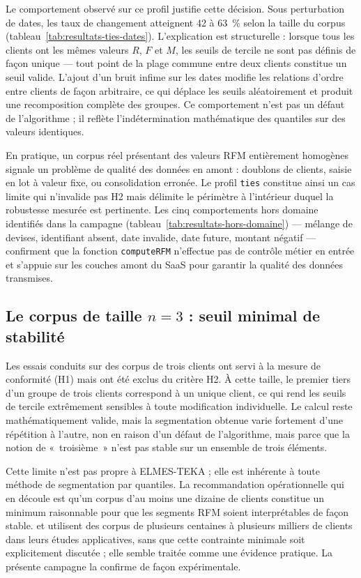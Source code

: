 Le comportement observé sur ce profil justifie cette décision. Sous perturbation de dates,
les taux de changement atteignent 42 à 63~\% selon la taille du corpus
(tableau~\ref{tab:resultats-ties-dates}). L'explication est structurelle : lorsque tous les
clients ont les mêmes valeurs $R$, $F$ et $M$, les seuils de tercile ne sont pas définis de
façon unique — tout point de la plage commune entre deux clients constitue un seuil valide.
L'ajout d'un bruit infime sur les dates modifie les relations d'ordre entre clients de façon
arbitraire, ce qui déplace les seuils aléatoirement et produit une recomposition complète des
groupes. Ce comportement n'est pas un défaut de l'algorithme ; il reflète l'indétermination
mathématique des quantiles sur des valeurs identiques.

En pratique, un corpus réel présentant des valeurs RFM entièrement homogènes signale un
problème de qualité des données en amont : doublons de clients, saisie en lot à valeur fixe,
ou consolidation erronée. Le profil \texttt{ties} constitue ainsi un cas limite qui
n'invalide pas H2 mais délimite le périmètre à l'intérieur duquel la robustesse mesurée est
pertinente. Les cinq comportements hors domaine identifiés dans la campagne
(tableau~\ref{tab:resultats-hors-domaine}) — mélange de devises, identifiant absent, date
invalide, date future, montant négatif — confirment que la fonction \texttt{computeRFM}
n'effectue pas de contrôle métier en entrée et s'appuie sur les couches amont du SaaS pour
garantir la qualité des données transmises.

\subsection{Le corpus de taille $n = 3$ : seuil minimal de stabilité}
\label{subsec:disc-n3}

Les essais conduits sur des corpus de trois clients ont servi à la mesure de conformité (H1)
mais ont été exclus du critère H2. À cette taille, le premier tiers d'un groupe de trois
clients correspond à un unique client, ce qui rend les seuils de tercile extrêmement sensibles
à toute modification individuelle. Le calcul reste mathématiquement valide, mais la
segmentation obtenue varie fortement d'une répétition à l'autre, non en raison d'un défaut
de l'algorithme, mais parce que la notion de «~troisième~» n'est pas stable sur un ensemble
de trois éléments.

Cette limite n'est pas propre à ELMES-TEKA ; elle est inhérente à toute méthode de
segmentation par quantiles. La recommandation opérationnelle qui en découle est qu'un corpus
d'au moins une dizaine de clients constitue un minimum raisonnable pour que les segments RFM
soient interprétables de façon stable. \citet{Yoseph2023} et \citet{Ray2023} utilisent
des corpus de plusieurs centaines à plusieurs milliers de clients dans leurs études
applicatives, sans que cette contrainte minimale soit explicitement discutée ; elle semble
traitée comme une évidence pratique. La présente campagne la confirme de façon expérimentale.

